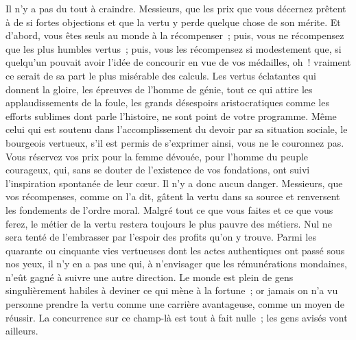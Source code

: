 \documentclass[french,twoside]{book} %
\begin{document}
Il n’y a pas du tout à craindre. Messieurs, que les prix que vous décernez prêtent à de si fortes objections et que la vertu y perde quelque chose de son mérite. Et d’abord, vous êtes seuls au monde à la récompenser ; puis, vous ne récompensez que les plus humbles vertus ; puis, vous les récompensez si modestement que, si quelqu’un pouvait avoir l’idée de concourir en vue de vos médailles, oh ! vraiment ce serait de sa part le plus misérable des calculs. Les vertus éclatantes qui donnent la gloire, les épreuves de l’homme de génie, tout ce qui attire les applaudissements de la foule, les grands désespoirs aristocratiques comme les efforts sublimes dont parle l’histoire, ne sont point de votre programme. Même celui qui est soutenu dans l’accomplissement du devoir par sa situation sociale, le bourgeois vertueux, s’il est permis de s’exprimer ainsi, vous ne le couronnez pas. Vous réservez vos prix pour la femme dévouée, pour l’homme du peuple courageux, qui, sans se douter de l’existence de vos fondations, ont suivi l’inspiration spontanée de leur cœur. Il n’y a donc aucun danger. Messieurs, que vos récompenses, comme on l’a dit, gâtent la vertu dans sa source et renversent les fondements de l’ordre moral. Malgré tout ce que vous faites et ce que vous ferez, le métier de la vertu restera toujours le plus pauvre des métiers. Nul ne sera tenté de l’embrasser par l’espoir des profits qu’on y trouve. Parmi les quarante ou cinquante vies vertueuses dont les actes authentiques ont passé sous nos yeux, il n’y en a pas une qui, à n’envisager que les rémunérations mondaines, n’eût gagné à suivre une autre direction. Le monde est plein de gens singulièrement habiles à deviner ce qui mène à la fortune ; or jamais on n’a vu personne prendre la vertu comme une carrière avantageuse, comme un moyen de réussir. La concurrence sur ce champ-là est tout à fait nulle ; les gens avisés vont ailleurs.\par
\end{document}

